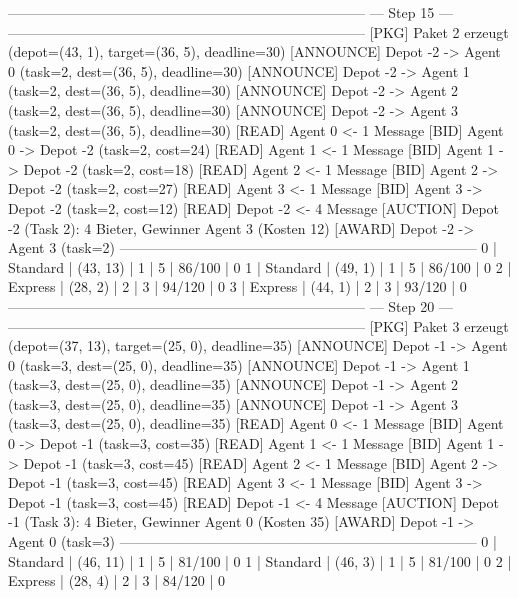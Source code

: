 -----------------------------------------------------------------------------
                               --- Step 15 ---
-----------------------------------------------------------------------------
[PKG]      Paket 2 erzeugt (depot=(43, 1), target=(36, 5), deadline=30)
[ANNOUNCE] Depot -2 -> Agent 0 (task=2, dest=(36, 5), deadline=30)
[ANNOUNCE] Depot -2 -> Agent 1 (task=2, dest=(36, 5), deadline=30)
[ANNOUNCE] Depot -2 -> Agent 2 (task=2, dest=(36, 5), deadline=30)
[ANNOUNCE] Depot -2 -> Agent 3 (task=2, dest=(36, 5), deadline=30)
[READ]    Agent 0 <- 1 Message
[BID]      Agent 0 -> Depot -2 (task=2, cost=24)
[READ]    Agent 1 <- 1 Message
[BID]      Agent 1 -> Depot -2 (task=2, cost=18)
[READ]    Agent 2 <- 1 Message
[BID]      Agent 2 -> Depot -2 (task=2, cost=27)
[READ]    Agent 3 <- 1 Message
[BID]      Agent 3 -> Depot -2 (task=2, cost=12)
[READ]    Depot -2 <- 4 Message
[AUCTION] Depot -2 (Task 2): 4 Bieter, Gewinner Agent 3 (Kosten 12)
[AWARD]    Depot -2 -> Agent 3 (task=2)
-----------------------------------------------------------------------------
 0     | Standard  | (43, 13)    | 1       | 5          | 86/100    | 0
 1     | Standard  | (49, 1)     | 1       | 5          | 86/100    | 0
 2     | Express   | (28, 2)     | 2       | 3          | 94/120    | 0
 3     | Express   | (44, 1)     | 2       | 3          | 93/120    | 0
-----------------------------------------------------------------------------
                               --- Step 20 ---
-----------------------------------------------------------------------------
[PKG]      Paket 3 erzeugt (depot=(37, 13), target=(25, 0), deadline=35)
[ANNOUNCE] Depot -1 -> Agent 0 (task=3, dest=(25, 0), deadline=35)
[ANNOUNCE] Depot -1 -> Agent 1 (task=3, dest=(25, 0), deadline=35)
[ANNOUNCE] Depot -1 -> Agent 2 (task=3, dest=(25, 0), deadline=35)
[ANNOUNCE] Depot -1 -> Agent 3 (task=3, dest=(25, 0), deadline=35)
[READ]    Agent 0 <- 1 Message
[BID]      Agent 0 -> Depot -1 (task=3, cost=35)
[READ]    Agent 1 <- 1 Message
[BID]      Agent 1 -> Depot -1 (task=3, cost=45)
[READ]    Agent 2 <- 1 Message
[BID]      Agent 2 -> Depot -1 (task=3, cost=45)
[READ]    Agent 3 <- 1 Message
[BID]      Agent 3 -> Depot -1 (task=3, cost=45)
[READ]    Depot -1 <- 4 Message
[AUCTION] Depot -1 (Task 3): 4 Bieter, Gewinner Agent 0 (Kosten 35)
[AWARD]    Depot -1 -> Agent 0 (task=3)
-----------------------------------------------------------------------------
 0     | Standard  | (46, 11)    | 1       | 5          | 81/100    | 0
 1     | Standard  | (46, 3)     | 1       | 5          | 81/100    | 0
 2     | Express   | (28, 4)     | 2       | 3          | 84/120    | 0
